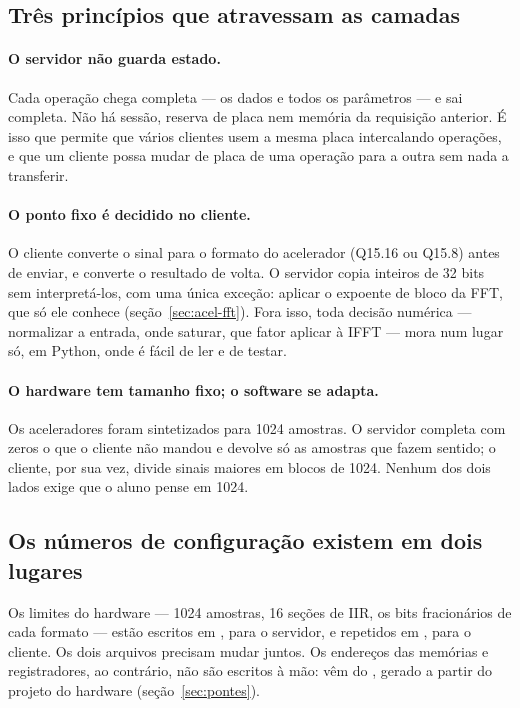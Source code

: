 \subsection*{Três princípios que atravessam as camadas}

\paragraph{O servidor não guarda estado.} Cada operação chega completa --- os
dados e todos os parâmetros --- e sai completa. Não há sessão, reserva de placa
nem memória da requisição anterior. É isso que permite que vários clientes usem
a mesma placa intercalando operações, e que um cliente possa mudar de placa de
uma operação para a outra sem nada a transferir.

\paragraph{O ponto fixo é decidido no cliente.} O cliente converte o sinal para
o formato do acelerador (Q15.16 ou Q15.8) antes de enviar, e converte o
resultado de volta. O servidor copia inteiros de 32 bits sem interpretá-los,
com uma única exceção: aplicar o expoente de bloco da FFT, que só ele conhece
(seção~\ref{sec:acel-fft}). Fora isso, toda decisão numérica --- normalizar a
entrada, onde saturar, que fator aplicar à IFFT --- mora num lugar só, em
Python, onde é fácil de ler e de testar.

\paragraph{O hardware tem tamanho fixo; o software se adapta.} Os aceleradores
foram sintetizados para 1024 amostras. O servidor completa com zeros o que o
cliente não mandou e devolve só as amostras que fazem sentido; o cliente, por
sua vez, divide sinais maiores em blocos de 1024. Nenhum dos dois lados exige
que o aluno pense em 1024.

\subsection*{Os números de configuração existem em dois lugares}

Os limites do hardware --- 1024 amostras, 16 seções de IIR, os bits
fracionários de cada formato --- estão escritos em , para
o servidor, e repetidos em , para o cliente. Os
dois arquivos precisam mudar juntos. Os endereços das memórias e registradores,
ao contrário, não são escritos à mão: vêm do , gerado a partir do
projeto do hardware (seção~\ref{sec:pontes}).

